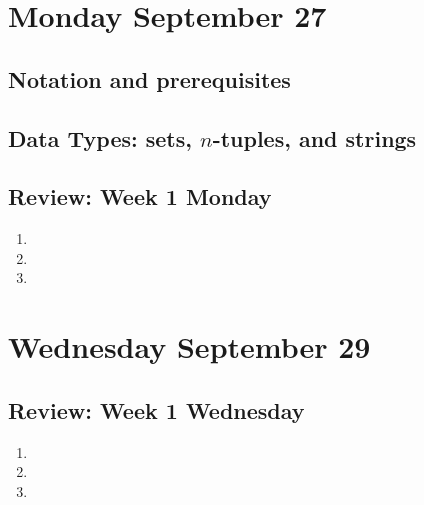 \section*{Monday September 27}
\subsection*{Notation and prerequisites}

\subsection*{Data Types: sets, $n$-tuples, and strings}




%

\newpage
\subsection*{Review: Week 1 Monday}
\begin{enumerate}
    \item {}
    \item {}
    \item {}
\end{enumerate}
\newpage
\section*{Wednesday September 29}




\newpage
\subsection*{Review: Week 1 Wednesday}
\begin{enumerate}
    \item {}
    \item {}
    \item {}
\end{enumerate}
\newpage
